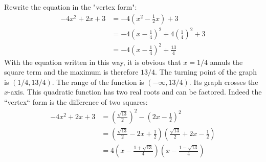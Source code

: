Rewrite the equation in the "vertex form":
\begin{align*}
-4x^2 + 2x + 3 
  & = -4 \left(x^2 - \frac{1}{2}x\right) + 3  \\
  & = -4 \left(x - \frac{1}{4}\right)^2 +4\left(\frac{1}{4}\right)^2 + 3 \\
  & = -4 \left(x - \frac{1}{4}\right)^2 +\frac{13}{4} 
\end{align*}
With the equation written in this way, it is obvious that $x=1/4$ annuls the square term and the maximum is therefore $13/4$. The turning point of the graph is $(1/4, 13/4)$. The range of the function is $(-\infty, 13/4)$. Its graph crosses the $x$-axis. This quadratic function has two real roots and can be factored. Indeed the ``vertex`` form is the difference of two squares: 
\begin{align*}
-4x^2 + 2x + 3 
  & = \left(\frac{\sqrt{13}}{2}\right)^2 -\left(2x - \frac{1}{2}\right)^2 \\
  & = \left(\frac{\sqrt{13}}{2} - 2x +\frac{1}{2}\right) \left(\frac{\sqrt{13}}{2} + 2x -\frac{1}{2}\right) \\
  & = 4 \left(x -\frac{1+\sqrt{13}}{4}\right) \left(x -\frac{1-\sqrt{13}}{4}\right)
\end{align*}
